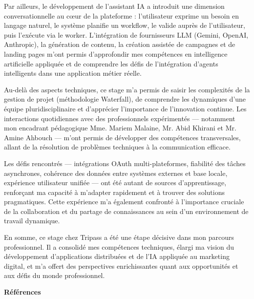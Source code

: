 \documentclass[12pt,a4paper]{report}
\numberwithin{figure}{chapter}
\numberwithin{table}{chapter}
\newcommand{\centeredgreentitle}[1]{%
  \vspace*{0.8cm}%
  \begin{center}
    {\fontsize{24}{28}\selectfont\bfseries\color{titlegreen} #1}
  \end{center}
  \vspace{0.5cm}
}
\newcommand{\addfrontmattertotoc}[1]{\addcontentsline{toc}{chapter}{#1}}
\begin{document}
Par ailleurs, le développement de l’assistant IA a introduit une dimension conversationnelle au cœur de la plateforme : l’utilisateur exprime un besoin en langage naturel, le système planifie un workflow, le valide auprès de l’utilisateur, puis l’exécute via le worker. L’intégration de fournisseurs LLM (Gemini, OpenAI, Anthropic), la génération de contenu, la création assistée de campagnes et de landing pages m’ont permis d’approfondir mes compétences en intelligence artificielle appliquée et de comprendre les défis de l’intégration d’agents intelligents dans une application métier réelle.

Au-delà des aspects techniques, ce stage m’a permis de saisir les complexités de la gestion de projet (méthodologie Waterfall), de comprendre les dynamiques d’une équipe pluridisciplinaire et d’apprécier l’importance de l’innovation continue. Les interactions quotidiennes avec des professionnels expérimentés — notamment mon encadrant pédagogique Mme. Mariem Malaine, Mr. Abid Khirani et Mr. Amine Ahbouch — m’ont permis de développer des compétences transversales, allant de la résolution de problèmes techniques à la communication efficace.

Les défis rencontrés — intégrations OAuth multi-plateformes, fiabilité des tâches asynchrones, cohérence des données entre systèmes externes et base locale, expérience utilisateur unifiée — ont été autant de sources d’apprentissage, renforçant ma capacité à m’adapter rapidement et à trouver des solutions pragmatiques. Cette expérience m’a également confronté à l’importance cruciale de la collaboration et du partage de connaissances au sein d’un environnement de travail dynamique.

En somme, ce stage chez Tripass a été une étape décisive dans mon parcours professionnel. Il a consolidé mes compétences techniques, élargi ma vision du développement d’applications distribuées et de l’IA appliquée au marketing digital, et m’a offert des perspectives enrichissantes quant aux opportunités et aux défis du monde professionnel.

\newpage

\centeredgreentitle{Références}
\addfrontmattertotoc{Références}
\end{document}
